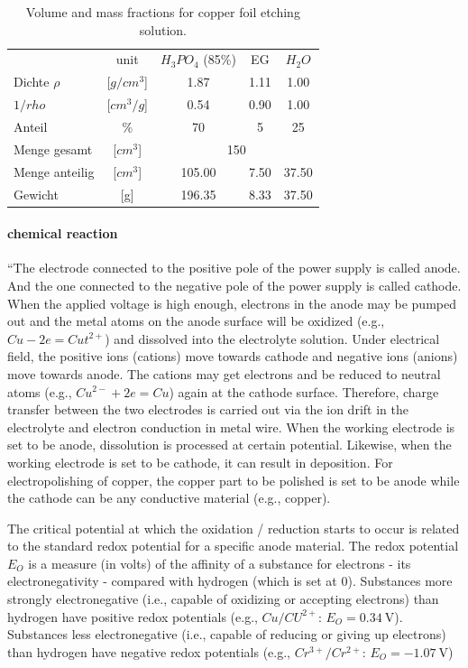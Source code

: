 \begin{table}
	\centering
	\caption{Volume and mass fractions for copper foil etching solution.}
	\begin{tabular}{lcccc}
		&unit	&$H_3PO_4$ (85\%)&	EG	&	$H_2O$	\\
		Dichte $\rho$   &[$g/cm^3$]	&	1.87	&	1.11	&	1.00	\\
		$1/rho$		&[$cm^3/g$]	&	0.54	&	0.90	&	1.00	\\
		Anteil 		& \%		&	70	&	5	&	25	\\ \hline
		Menge gesamt    &[$cm^3$]	&		\multicolumn{3}{c}{150} 	\\
		Menge anteilig  &[$cm^3$]	&	105.00	&	7.50	&	37.50	\\
		Gewicht         &[g]		&	196.35	&	8.33	&	37.50	\\
	\end{tabular}
	\label{tab:used-etching-solution}
\end{table}

\paragraph{chemical reaction}
``The electrode connected to the positive pole of the power supply is called anode. And the one connected to the negative pole of the power supply is called cathode. When the applied voltage is high enough, electrons in the anode may be pumped out and the metal atoms on the anode surface will be oxidized (e.g., $Cu - 2e = Cut^{2+}$) and dissolved into the electrolyte solution. Under electrical field, the positive ions (cations) move towards cathode and negative ions (anions) move towards anode. The cations may get electrons and be reduced to neutral atoms (e.g., $Cu^{2-} + 2e = Cu$) again at the cathode surface. Therefore, charge transfer between the two electrodes is carried out via the ion drift in the electrolyte and electron conduction in metal wire. When the working electrode is set to be anode, dissolution is processed at certain potential. Likewise, when the working electrode is set to be cathode, it can result in deposition. For electropolishing of copper, the copper part to be polished is set to be anode while the cathode can be any conductive material (e.g., copper).

The critical potential at which the oxidation / reduction starts to occur is related to the standard redox potential for a specific anode material. The redox potential $E_O$ is a measure (in volts) of the affinity of a substance for electrons - its electronegativity - compared with hydrogen (which is set at 0). Substances more strongly electronegative (i.e., capable of oxidizing or accepting electrons) than hydrogen have positive redox potentials (e.g., $Cu/CU^{2+}$: $E_O = \SI{0.34}{\volt}$). Substances less electronegative (i.e., capable of reducing or giving up electrons) than hydrogen have negative redox potentials (e.g., $Cr^{3+}/Cr^{2+}$: $E_O = \SI{-1.07}{\volt}$)\cite{jinshan_electrochemical_2004}

